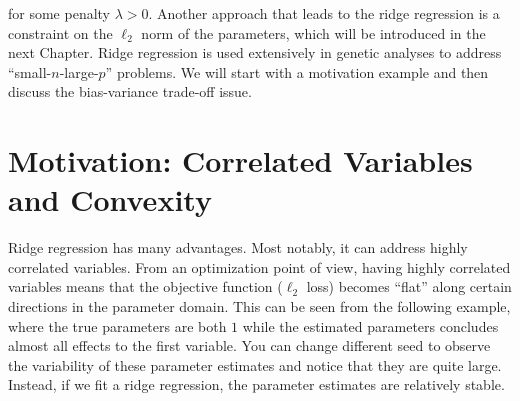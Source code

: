 \documentclass[
]{book}
\theoremstyle{definition}
\theoremstyle{definition}
\theoremstyle{definition}
\theoremstyle{definition}
\theoremstyle{remark}
\begin{document}
for some penalty \(\lambda > 0\). Another approach that leads to the ridge regression is a constraint on the \(\ell_2\) norm of the parameters, which will be introduced in the next Chapter. Ridge regression is used extensively in genetic analyses to address ``small-\(n\)-large-\(p\)'' problems. We will start with a motivation example and then discuss the bias-variance trade-off issue.

\hypertarget{motivation-correlated-variables-and-convexity}{%
\section{Motivation: Correlated Variables and Convexity}\label{motivation-correlated-variables-and-convexity}}

Ridge regression has many advantages. Most notably, it can address highly correlated variables. From an optimization point of view, having highly correlated variables means that the objective function (\(\ell_2\) loss) becomes ``flat'' along certain directions in the parameter domain. This can be seen from the following example, where the true parameters are both \(1\) while the estimated parameters concludes almost all effects to the first variable. You can change different seed to observe the variability of these parameter estimates and notice that they are quite large. Instead, if we fit a ridge regression, the parameter estimates are relatively stable.
\end{document}
